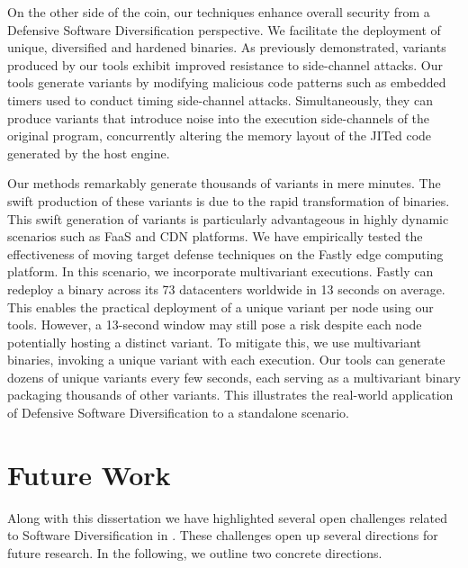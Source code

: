 On the other side of the coin, our techniques enhance overall security from a Defensive Software Diversification perspective.
We facilitate the deployment of unique, diversified and hardened \Wasm binaries.
As previously demonstrated, \Wasm variants produced by our tools exhibit improved resistance to side-channel attacks.
Our tools generate variants by modifying malicious code patterns such as embedded timers used to conduct timing side-channel attacks.
Simultaneously, they can produce variants that introduce noise into the execution side-channels of the original program, concurrently altering the memory layout of the JITed code generated by the host engine.


Our methods remarkably generate thousands of variants in mere minutes. 
The swift production of these variants is due to the rapid transformation of \Wasm binaries. 
This swift generation of variants is particularly advantageous in highly dynamic scenarios such as FaaS and CDN platforms. 
We have empirically tested the effectiveness of moving target defense techniques\cite{jackson2011compiler} on the Fastly edge computing platform. 
In this scenario, we incorporate multivariant executions\cite{MEWE}. 
Fastly can redeploy a \Wasm binary across its 73 datacenters worldwide in 13 seconds on average. 
This enables the practical deployment of a unique variant per node using our tools. 
However, a 13-second window may still pose a risk despite each node potentially hosting a distinct \Wasm variant. 
To mitigate this, we use multivariant binaries, invoking a unique variant with each execution. 
Our tools can generate dozens of unique variants every few seconds, each serving as a multivariant binary packaging thousands of other variants. 
This illustrates the real-world application of Defensive Software Diversification to a \Wasm standalone scenario.







\section{Future Work}

Along with this dissertation we have highlighted several open challenges related to Software Diversification in \Wasm.
These challenges open up several directions for future research.
In the following, we outline two concrete directions.



